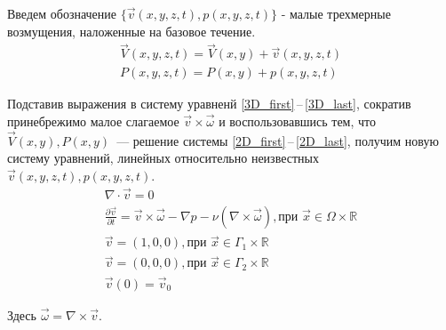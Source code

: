 Введем обозначение $\{ \vec v(x,y,z,t), p(x,y,z,t) \} $ - малые трехмерные возмущения, наложенные на базовое течение. 
\begin{gather*}
  \vec V(x,y,z,t) = \vec V(x,y) + \vec v(x,y,z,t) \\
  P(x,y,z,t) = P(x,y) + p(x,y,z,t)
\end{gather*}

Подставив выражения в систему уравненй \ref{3D_first}\,--\,\ref{3D_last}, сократив принебрежимо малое слагаемое $ \vec v \times \vec \omega $ и воспользовавшись тем, что  $\vec V(x,y), P(x,y) $~--- решение системы \ref{2D_first}\,--\,\ref{2D_last}, получим новую систему уравнений, линейных относительно неизвестных $ \vec v(x,y,z,t), p(x,y,z,t) $.
\begin{gather} 
  \label{lin3D_first}
  \nabla \cdot \vec v = 0\\
  \frac{\partial \vec v}{\partial t} = \vec v \times \vec \omega - \nabla p - 
  \nu ( \nabla \times \vec \omega ), \text{при } \vec x \in \Omega \times \mathbb{R}\\
  \vec v = (1,0,0), \text{при } \vec x \in \Gamma_1 \times \mathbb{R} \\
  \vec v = (0,0,0), \text{при } \vec x \in \Gamma_2 \times \mathbb{R} \\
  \vec v (0) = \vec v _0 \label{lin3D_last}
\end{gather}

Здесь $ \vec \omega = \nabla \times \vec v $.